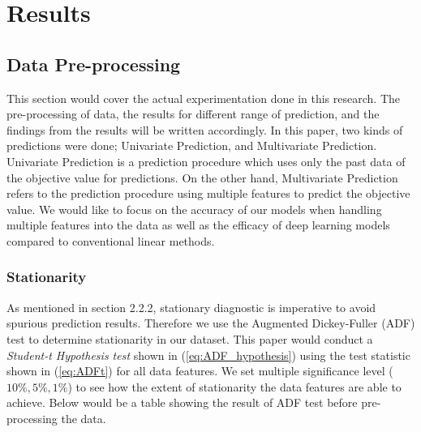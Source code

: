 \section{Results}
\subsection{Data Pre-processing}
This section would cover the actual experimentation done in this research. The pre-processing of data, the results for different range of prediction, and the findings from the results will be written accordingly. In this paper, two kinds of predictions were done; Univariate Prediction, and Multivariate Prediction. Univariate Prediction is a prediction procedure which uses only the past data of the objective value for predictions. On the other hand, Multivariate Prediction refers to the prediction procedure using multiple features to predict the objective value. We would like to focus on the accuracy of our models when handling multiple features into the data as well as the efficacy of deep learning models compared to conventional linear methods. 

\subsubsection{Stationarity}
As mentioned in section 2.2.2, stationary diagnostic is imperative to avoid spurious prediction results. Therefore we use the Augmented Dickey-Fuller (ADF) test to determine stationarity in our dataset. This paper would conduct a \textit{Student-t Hypothesis test} shown in (\ref{eq:ADF_hypothesis}) using the test statistic shown in (\ref{eq:ADFt}) for all data features. We set multiple significance level ($10\%, 5\%, 1\%$) to see how the extent of stationarity the data features are able to achieve. Below would be a table showing the result of ADF test before pre-processing the data.

